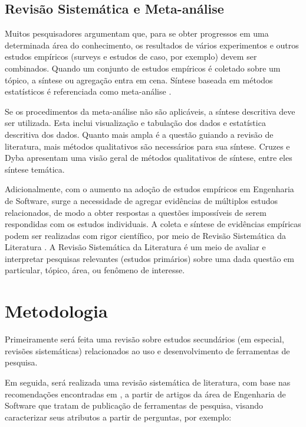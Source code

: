 \documentclass[12pt]{article}
\begin{document}
\subsection{Revisão Sistemática e Meta-análise}

Muitos pesquisadores argumentam que, para se obter progressos em uma
determinada área do conhecimento, os resultados de vários experimentos e
outros estudos empíricos (surveys e estudos de caso, por exemplo) devem ser
combinados. Quando um conjunto de estudos empíricos é coletado sobre um
tópico, a síntese ou agregação entra em cena. Síntese baseada em métodos
estatísticos é referenciada como meta-análise \cite{Almqvist2006}.

Se os procedimentos da meta-análise não são aplicáveis, a síntese descritiva
deve ser utilizada. Esta inclui visualização e tabulação dos dados e
estatística descritiva dos dados. Quanto mais ampla é a questão guiando a
revisão de literatura, mais métodos qualitativos são necessários para sua
síntese. Cruzes e Dyba \cite{Cruzes2011} apresentam uma visão geral de métodos
qualitativos de síntese, entre eles síntese temática.

Adicionalmente, com o aumento na adoção de estudos empíricos em Engenharia de
Software, surge a necessidade de agregar evidências de múltiplos estudos
relacionados, de modo a obter respostas a questões impossíveis de serem
respondidas com os estudos individuais. A coleta e síntese de evidências
empíricas podem ser realizadas com rigor científico, por meio de Revisão
Sistemática da Literatura \cite{Kitchenham2007}. A Revisão Sistemática da
Literatura  é um meio de avaliar e interpretar pesquisas relevantes (estudos
primários) sobre uma dada questão em particular, tópico, área, ou fenômeno de
interesse.

\section{Metodologia}

Primeiramente será feita uma revisão sobre estudos secundários (em especial,
revisões sistemáticas) relacionados ao uso e desenvolvimento de ferramentas de
pesquisa.
  
Em seguida, será realizada uma revisão sistemática de literatura, com base nas
recomendações encontradas em \cite{Kitchenham2007}, a partir
de artigos da área de Engenharia de Software que tratam de publicação de
ferramentas de pesquisa, visando caracterizar seus atributos a partir de
perguntas, por exemplo:
\end{document}
